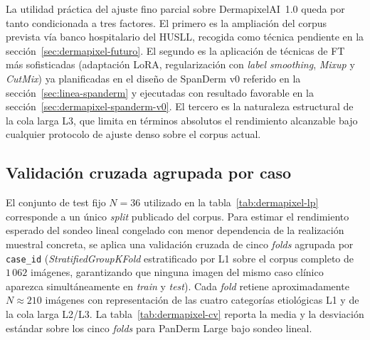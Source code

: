 La utilidad práctica del ajuste fino parcial sobre
DermapixelAI~1.0 queda por tanto condicionada a tres factores. El
primero es la ampliación del corpus prevista vía banco
hospitalario del HUSLL, recogida como técnica pendiente en la
secci\'on~\ref{sec:dermapixel-futuro}. El segundo es la aplicación
de técnicas de FT más sofisticadas (adaptación LoRA, regularización
con \emph{label smoothing}, \emph{Mixup} y \emph{CutMix}) ya
planificadas en el diseño de SpanDerm v0 referido en la
secci\'on~\ref{sec:linea-spanderm} y ejecutadas con resultado
favorable en la secci\'on~\ref{sec:dermapixel-spanderm-v0}. El
tercero es la naturaleza estructural de la cola larga L3, que
limita en términos absolutos el rendimiento alcanzable bajo
cualquier protocolo de ajuste denso sobre el corpus actual.

\subsection*{Validación cruzada agrupada por caso}

El conjunto de test fijo $N = 36$ utilizado en la
tabla~\ref{tab:dermapixel-lp} corresponde a un único \emph{split}
publicado del corpus. Para estimar el rendimiento esperado del
sondeo lineal congelado con menor dependencia de la realización
muestral concreta, se aplica una validación cruzada de cinco
\emph{folds} agrupada por \texttt{case\_id}
(\emph{StratifiedGroupKFold} estratificado por L1 sobre el corpus
completo de $1\,062$ imágenes, garantizando que ninguna imagen del
mismo caso clínico aparezca simultáneamente en \emph{train} y
\emph{test}). Cada \emph{fold} retiene aproximadamente
$N \approx 210$ imágenes con representación de las cuatro
categorías etiológicas L1 y de la cola larga L2/L3. La
tabla~\ref{tab:dermapixel-cv} reporta la media y la desviación
estándar sobre los cinco \emph{folds} para PanDerm Large bajo
sondeo lineal.

